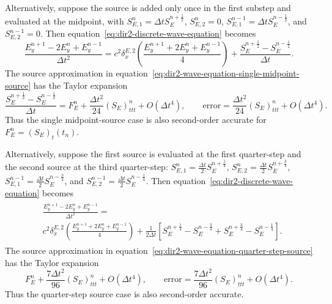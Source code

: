 \documentclass{article}
\numberwithin{figure}{section}
\begin{document}
Alternatively, suppose the source is added only once in the first substep and evaluated at the midpoint, with $S_{E,1}^n=\Delta t S_E^{n+\frac{1}{2}}$, $S_{E,2}^n=0$, $S_{E,1}^{n-1}=\Delta t S_E^{n-\frac{1}{2}}$, and $S_{E,2}^{n-1}=0$. Then equation~\eqref{eq:dir2-discrete-wave-equation} becomes
\begin{equation}
    \frac{E_y^{n+1}-2E_y^n+E_y^{n-1}}{\Delta t^2}=c^2\delta_x^{E,2}\left(\frac{E_y^{n+1}+2E_y^n+E_y^{n-1}}{4}\right)+\frac{S_E^{n+\frac{1}{2}}-S_E^{n-\frac{1}{2}}}{\Delta t}. \label{eq:dir2-wave-equation-single-midpoint-source}
\end{equation}
The source approximation in equation~\eqref{eq:dir2-wave-equation-single-midpoint-source} has the Taylor expansion
\begin{equation}
    \frac{S_E^{n+\frac{1}{2}}-S_E^{n-\frac{1}{2}}}{\Delta t}=F_E^n+\frac{\Delta t^2}{24}(S_E)_{ttt}^n+O(\Delta t^4), \qquad \mathrm{error}=\frac{\Delta t^2}{24}(S_E)_{ttt}^n+O(\Delta t^4). \label{eq:dir2-single-midpoint-source-error}
\end{equation}
Thus the single midpoint-source case is also second-order accurate for $F_E^n=(S_E)_t(t_n)$.

Alternatively, suppose the first source is evaluated at the first quarter-step and the second source at the third quarter-step:
$S_{E,1}^n=\frac{\Delta t}{2}S_E^{n+\frac{1}{4}}$, $S_{E,2}^n=\frac{\Delta t}{2}S_E^{n+\frac{3}{4}}$, $S_{E,1}^{n-1}=\frac{\Delta t}{2}S_E^{n-\frac{3}{4}}$, and $S_{E,2}^{n-1}=\frac{\Delta t}{2}S_E^{n-\frac{1}{4}}$. Then equation~\eqref{eq:dir2-discrete-wave-equation} becomes
\begin{align}
    \begin{split}
         & \frac{E_y^{n+1}-2E_y^n+E_y^{n-1}}{\Delta t^2}=                                                                                                                                         \\
         & c^2\delta_x^{E,2}\left(\frac{E_y^{n+1}+2E_y^n+E_y^{n-1}}{4}\right)+\frac{1}{2\Delta t}\left[S_E^{n+\frac{1}{4}}-S_E^{n-\frac{3}{4}}+S_E^{n+\frac{3}{4}}-S_E^{n-\frac{1}{4}}\right]. \label{eq:dir2-wave-equation-quarter-step-source}
    \end{split}
\end{align}
The source approximation in equation~\eqref{eq:dir2-wave-equation-quarter-step-source} has the Taylor expansion
\begin{equation}
    F_E^n+\frac{7\Delta t^2}{96}(S_E)_{ttt}^n+O(\Delta t^4), \qquad \mathrm{error}=\frac{7\Delta t^2}{96}(S_E)_{ttt}^n+O(\Delta t^4). \label{eq:dir2-quarter-step-source-error}
\end{equation}
Thus the quarter-step source case is also second-order accurate.
\end{document}
